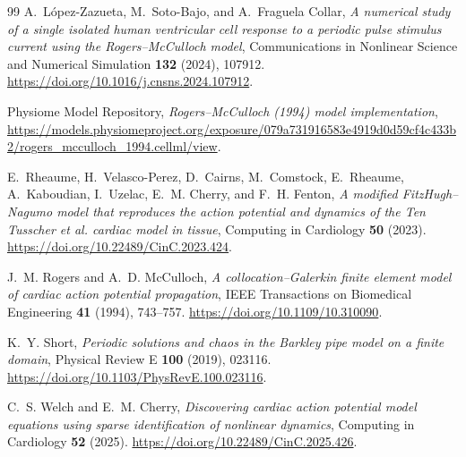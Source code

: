 \documentclass[11pt,a4paper]{article}
\begin{document}
\begin{thebibliography}{99}
A.~L\'opez-Zazueta, M.~Soto-Bajo, and A.~Fraguela Collar,
\emph{A numerical study of a single isolated human ventricular cell response to a periodic pulse stimulus current using the Rogers--McCulloch model},
Communications in Nonlinear Science and Numerical Simulation \textbf{132} (2024), 107912.
\url{https://doi.org/10.1016/j.cnsns.2024.107912}.

Physiome Model Repository,
\emph{Rogers--McCulloch (1994) model implementation},
\url{https://models.physiomeproject.org/exposure/079a731916583e4919d0d59cf4c433b2/rogers_mcculloch_1994.cellml/view}.

E.~Rheaume, H.~Velasco-Perez, D.~Cairns, M.~Comstock, E.~Rheaume,
A.~Kaboudian, I.~Uzelac, E.~M. Cherry, and F.~H. Fenton,
\emph{A modified FitzHugh--Nagumo model that reproduces the action potential and dynamics of the Ten Tusscher et al. cardiac model in tissue},
Computing in Cardiology \textbf{50} (2023).
\url{https://doi.org/10.22489/CinC.2023.424}.

J.~M. Rogers and A.~D. McCulloch,
\emph{A collocation--Galerkin finite element model of cardiac action potential propagation},
IEEE Transactions on Biomedical Engineering \textbf{41} (1994), 743--757.
\url{https://doi.org/10.1109/10.310090}.

K.~Y. Short,
\emph{Periodic solutions and chaos in the Barkley pipe model on a finite domain},
Physical Review E \textbf{100} (2019), 023116.
\url{https://doi.org/10.1103/PhysRevE.100.023116}.

C.~S. Welch and E.~M. Cherry,
\emph{Discovering cardiac action potential model equations using sparse identification of nonlinear dynamics},
Computing in Cardiology \textbf{52} (2025).
\url{https://doi.org/10.22489/CinC.2025.426}.

\end{thebibliography}
\end{document}
